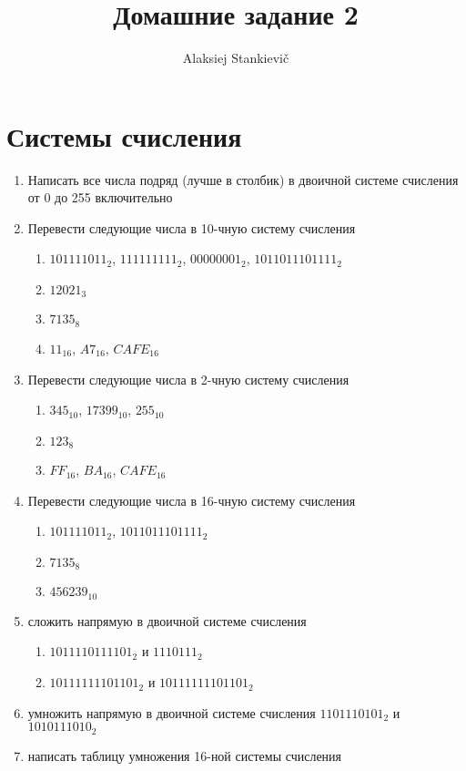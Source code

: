 \documentclass[12pt]{article}
\author{Alaksiej Stankievič}
\title{Домашние задание 2}
\begin{document}
\section{Системы счисления}
\begin{enumerate}
 \item Написать все числа подряд (лучше в столбик) в двоичной системе счисления от 0 до 255 включительно
 \item Перевести следующие числа в 10-чную систему счисления 
 \begin{enumerate}
    \item $101111011_2$, $111111111_2$, $00000001_2$, $1011011101111_2$
    \item $12021_3$
    \item $7135_8$
    \item $11_{16}$, $A7_{16}$, $CAFE_{16}$
 \end{enumerate}
 
 \item Перевести следующие числа в 2-чную систему счисления
 \begin{enumerate}
  \item $345_{10}$, $17399_{10}$, $255_{10}$
  \item $123_8$
  \item $FF_{16}$, $BA_{16}$, $CAFE_{16}$
 \end{enumerate}
 \item Перевести следующие числа в 16-чную систему счисления
 \begin{enumerate}
  \item $101111011_2$, $1011011101111_2$
  \item $7135_8$
  \item $456239_{10}$
 \end{enumerate}

 \item сложить напрямую в двоичной системе счисления 
 \begin{enumerate}
  \item $1011110111101_2$ и $1110111_2$
  \item $10111111101101_2$ и $10111111101101_2$
 \end{enumerate}
 \item умножить напрямую в двоичной системе счисления $1101110101_2$ и $1010111010_2$
 \item написать таблицу умножения 16-ной системы счисления
\end{enumerate}
\end{document}
